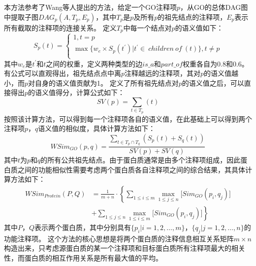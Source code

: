 本方法参考了Wang等人\cite{wang_new_2007}提出的方法，给定一个GO注释项$p$，从GO的总体DAG图中提取子图$DAG_p(A,T_p,E_p)$，其中$T_p$是$p$及所有$p$的祖先结点的注释项，$E_p$表示所有截取的注释项的连接关系。
定义$T_p$中每一个结点对$p$的语义值如下：
\begin{equation}
    \label{equ:feat:go:SAT}
    S_p(t)=\left\{\begin{array}{l}
        1,t=p                                                                        \\
        \max {\{ w_e\times S_p(t^\prime )| t^\prime\in ~children~of~(t) \} },t\neq p \\
    \end{array}\right.
\end{equation}
其中$w_e$是$t^\prime$和$t$之间的权重，定义两种类型的边$is\_a$和$part\_of$权重各自为0.8和0.6。有公式可以直观得出，祖先结点点中离$p$注释越远的注释项，其对$p$的语义值越小，而$p$对自身的语义值贡献为1。
定义了所有祖先结点对$p$的语义值之后，可以直接得出$p$的语义值得分，计算公式如下：
\begin{equation}
    \label{equ:feat:go:SVA}
    SV(p)=\sum_{t \in T_p}(t)
\end{equation}
按照该计算方法，可以得到每一个注释项各自的语义值，在此基础上可以得到两个注释项$p$，$q$语义值的相似度，具体计算方法如下：
\begin{equation}
    \label{equ:feat:go:SimItemWang}
    WSim_{GO}(p,q)=\frac{\sum_{t \in T_p \cap T_q}(S_p(t)+S_q(t))}{SV(p)+SV(q)}
\end{equation}
其中$t$为$p$和$q$的所有公共祖先结点。由于蛋白质通常是由多个注释项组成，因此蛋白质之间的功能相似性需要考虑两个蛋白质各自注释项之间的综合结果，其具体计算方法如下：
\begin{equation}
    \label{equ:feat:go:SimProteinWang}
    \begin{aligned}
        WSim_{Protein}(P,Q) & =\frac{1}{m+n}\cdot \left\{\sum_{1\leq i\leq m}{\max_{1\leq j\leq n}[{Sim_{GO}(p_i,q_j)}}]\right. \\
                            & \left.+\sum_{1\leq j\leq n}{\max_{1\leq i\leq m}[{Sim_{GO}(p_i,q_j)}}]\right\}
    \end{aligned}
\end{equation}
其中$P$，$Q$表示两个蛋白质，其中分别具有$\{p_i| i=1,2,\dots,m\}$，$\{q_j| j=1,2,\dots,n\}$的功能注释项。
这个方法的核心思想是将两个蛋白质的注释信息相互关系矩阵$m\times n$构造出来，只考虑源蛋白质的某一个注释项和目标蛋白质所有注释项最大的相关性，而蛋白质的相互作用关系是所有最大值的平均。

